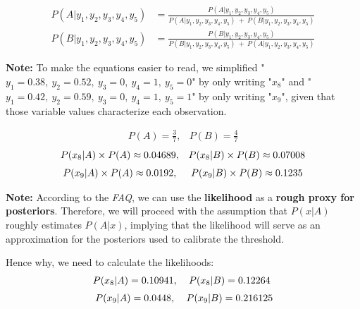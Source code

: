 \documentclass[12pt]{article}
\begin{document}
\begin{enumerate}[leftmargin=\labelsep]
\begin{enumerate}
                \begin{equation}\label{exI1-c-N}
                  \begin{aligned}
                    P(A|y_1, y_2, y_3, y_4, y_5) & = \frac{P(A|y_1, y_2, y_3, y_4, y_5)}{P(A|y_1, y_2, y_3, y_4, y_5) \ + \ P(B|y_1, y_2, y_3, y_4, y_5)} \\
                    P(B|y_1, y_2, y_3, y_4, y_5) & = \frac{P(B|y_1, y_2, y_3, y_4, y_5)}{P(B|y_1, y_2, y_3, y_4, y_5) \ + \ P(A|y_1, y_2, y_3, y_4, y_5)}
                  \end{aligned}
                \end{equation}

                \textbf{Note:} To make the equations easier to read, we simplified "$y_1 = 0.38, \ y_2 = 0.52, \ y_3 = 0, \ y_4 = 1, \ y_5 = 0$" by only writing "$x_8$"
                and "$y_1 = 0.42, \ y_2 = 0.59, \ y_3 = 0, \ y_4 = 1, \ y_5 = 1$" by only writing "$x_9$", given that those variable values characterize each observation.

                \[
                  \begin{array}{cc}
                    P(A) = \frac{3}{7}, &
                    P(B) = \frac{4}{7}
                  \end{array}
                \]
                \[
                  \begin{array}{cc}
                    P(x_8 | A) \times P(A) \approx 0.04689, &
                    P(x_8 | B) \times P(B) \approx 0.07008    \\[\medskipamount]
                    P(x_9 | A) \times P(A) \approx 0.0192,  &
                    P(x_9 | B) \times P(B) \approx 0.1235
                  \end{array}
                \]

                \textbf{Note:} According to the \textit{FAQ}, we can use the \textbf{likelihood} as a \textbf{rough proxy for posteriors}.
                Therefore, we will proceed with the assumption that $P(x | A)$ roughly estimates $P(A | x)$, implying that the likelihood
                will serve as an approximation for the posteriors used to calibrate the threshold.

                Hence why, we need to calculate the likelihoods:
                $$
                  \begin{array}{cc}
                    P(x_8 | A) = 0.10941, &
                    P(x_8 | B) = 0.12264    \\[\medskipamount]
                    P(x_9 | A) = 0.0448,  &
                    P(x_9 | B) = 0.216125
                  \end{array}
                $$


\end{enumerate}
\end{enumerate}
\end{document}
